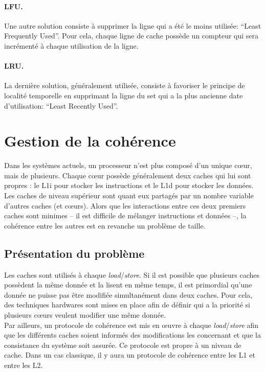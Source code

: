 \paragraph{LFU.} Une autre solution consiste à supprimer la ligne qui a été le moins utilisée: ``Least Frequently Used''. Pour cela, chaque ligne de cache possède un compteur qui sera incrémenté à chaque utilisation de la ligne. 

\paragraph{LRU.} La dernière solution, généralement utilisée, consiste à favoriser le principe de localité temporelle en supprimant la ligne du set qui a la plus ancienne date d'utilisation: ``Least Recently Used''.

\newpage
\section{Gestion de la cohérence}
Dans les systèmes actuels, un processeur n'est plus composé d'un unique c{\oe}ur, mais de plusieurs. Chaque c{\oe}ur possède généralement deux caches qui lui sont propres : le L1i pour stocker les instructions et le L1d pour stocker les données. Les caches de niveau supérieur sont quant  eux partagés par un nombre variable d'autres caches (et c{\oe}urs). Alors que les interactions entre ces deux premiers caches sont minimes -- il est difficile de mélanger instructions et données --, la cohérence entre les autres est en revanche un problème de taille.

\subsection{Présentation du problème}
Les caches sont utilisés à chaque \textit{load}/\textit{store}. Si il est possible que plusieurs caches possèdent la même donnée et la lisent en même temps, il est primordial qu'une donnée ne puisse pas être modifiée simultanément dans deux caches. Pour cela, des techniques hardwares sont mises en place afin de définir qui a la priorité si plusieurs c{\oe}urs veulent modifier une même donnée. \\

Par ailleurs, un protocole de cohérence est mis en {\oe}uvre à chaque \textit{load}/\textit{store} afin que les différents caches soient informés des modifications les concernant et que la consistance du système soit assurée. Ce protocole est propre à un niveau de cache. Dans un cas classique, il y aura un protocole de cohérence entre les L1 et entre les L2.

